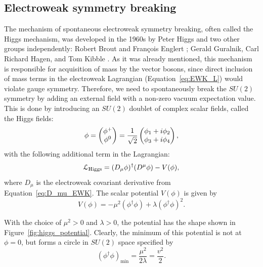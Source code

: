 \subsection{Electroweak symmetry breaking}
\label{ss:electroweak_symmetry_breaking}
The mechanism of spontaneous electroweak symmetry breaking, often called the Higgs mechanism, was developed in the 1960s
by Peter Higgs \autocite{Higgs} and two other groups independently: Robert Brout and Fran\c{c}ois Englert
\autocite{Englert_Brout}; Gerald Guralnik, Carl Richard Hagen, and Tom Kibble \autocite{Guralnik_Hagen_Kibble}. As it
was already mentioned, this mechanism is responsible for acquisition of mass by the vector bosons, since direct
inclusion of mass terms in the electroweak Lagrangian (Equation~\ref{eq:EWK_L}) would violate gauge symmetry. Therefore,
we need to spontaneously break the $SU(2)$ symmetry by adding an external field with a non-zero vacuum expectation
value. This is done by introducing an $SU(2)$ doublet of complex scalar fields, called the Higgs fields:
\begin{equation}
\phi = \begin{pmatrix} \phi^+ \\ \phi^0 \end{pmatrix} = \frac{1}{\sqrt{2}} \begin{pmatrix} \phi_1 + i \phi_2 \\ \phi_3 + i \phi_4 \end{pmatrix},
\end{equation}
with the following additional term in the Lagrangian:
\begin{equation}
\mathcal{L}_\textrm{Higgs} = (D_\mu \phi)^{\dag} (D^\mu \phi) - V(\phi),
\label{eq:Higgs_L}
\end{equation}
where $D_\mu$ is the electroweak covariant derivative from Equation~\ref{eq:D_mu_EWK}. The scalar potential $V(\phi)$
is given by
\begin{equation}
V(\phi) = - \mu^2(\phi^{\dag} \phi) + \lambda(\phi^{\dag} \phi)^2.
\end{equation}

With the choice of $\mu^2>0$ and $\lambda>0$, the potential has the shape shown in Figure~\ref{fig:higgs_potential}.
Clearly, the minimum of this potential is not at $\phi = 0$, but forms a circle in $SU(2)$ space specified by
\begin{equation}
(\phi^{\dag} \phi)_\textrm{min} = \frac{\mu^2}{2\lambda} = \frac{v^2}{2}.
\end{equation}


